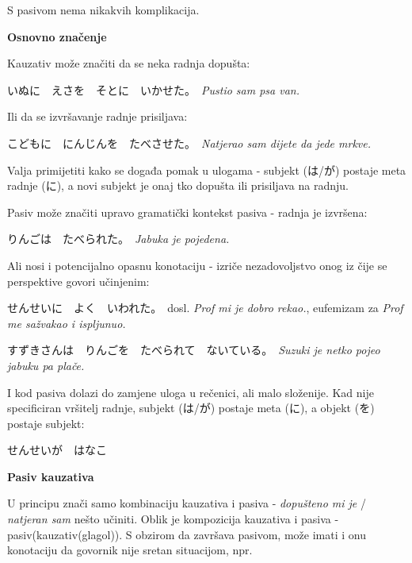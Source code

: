 \documentclass[12pt]{article}
\begin{document}
	S pasivom nema nikakvih komplikacija.
	
	\vspace{20pt}
	\normalsize \textbf{Osnovno značenje}
	\vspace{20pt}
	
	Kauzativ može značiti da se neka radnja dopušta:
	
	いぬに　えさを　そとに　いかせた。　\textit{Pustio sam psa van.}
	
	Ili da se izvršavanje radnje prisiljava:
	
	こどもに　にんじんを　たべさせた。　\textit{Natjerao sam dijete da jede mrkve.}
	
	Valja primijetiti kako se događa pomak u ulogama - subjekt (は/が) postaje meta radnje (に), a novi subjekt je onaj tko dopušta ili prisiljava na radnju.
	
	\vspace{10pt}
	
	Pasiv može značiti upravo gramatički kontekst pasiva - radnja je izvršena:
	
	りんごは　たべられた。　\textit{Jabuka je pojedena.}
	
	Ali nosi i potencijalno opasnu konotaciju - izriče nezadovoljstvo onog iz čije se perspektive govori učinjenim:
	
	せんせいに　よく　いわれた。　dosl. \textit{Prof mi je dobro rekao.}, eufemizam za \textit{Prof me sažvakao i ispljunuo.}
	
	すずきさんは　りんごを　たべられて　ないている。　\textit{Suzuki je netko pojeo jabuku pa plače.}
	
	I kod pasiva dolazi do zamjene uloga u rečenici, ali malo složenije. Kad nije specificiran vršitelj radnje, subjekt (は/が) postaje meta (に), a objekt (を) postaje subjekt:
	
	せんせいが　はなこ
	
	
	\newpage
	\vspace{20pt}
	\normalsize \textbf{Pasiv kauzativa}
	\vspace{20pt}
	
	U principu znači samo kombinaciju kauzativa i pasiva - \textit{dopušteno mi je} / \textit{natjeran sam} nešto učiniti. Oblik je kompozicija kauzativa i pasiva - pasiv(kauzativ(glagol)). S obzirom da završava pasivom, može imati i onu konotaciju da govornik nije sretan situacijom, npr.
	
\end{document}
